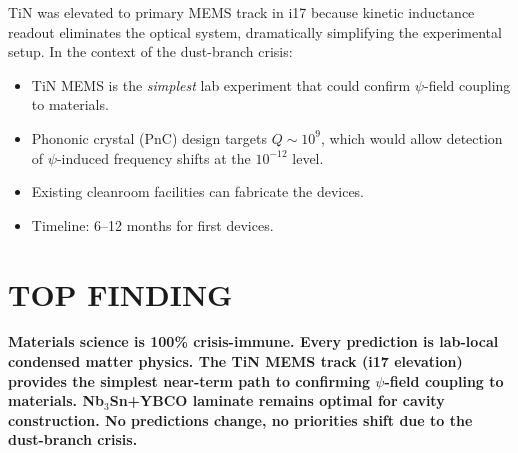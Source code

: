 \documentclass[11pt]{article}
\begin{document}
TiN was elevated to primary MEMS track in i17 because kinetic inductance
readout eliminates the optical system, dramatically simplifying the
experimental setup. In the context of the dust-branch crisis:

\begin{itemize}
\item TiN MEMS is the \emph{simplest} lab experiment that could confirm
  $\psi$-field coupling to materials.
\item Phononic crystal (PnC) design targets $Q \sim 10^9$, which would
  allow detection of $\psi$-induced frequency shifts at the $10^{-12}$
  level.
\item Existing cleanroom facilities can fabricate the devices.
\item Timeline: 6--12 months for first devices.
\end{itemize}

\section*{TOP FINDING}

\begin{tcolorbox}[colback=blue!5!white, colframe=blue!70!black]
\textbf{Materials science is 100\% crisis-immune. Every prediction is
lab-local condensed matter physics. The TiN MEMS track (i17 elevation)
provides the simplest near-term path to confirming $\psi$-field coupling
to materials. Nb$_3$Sn+YBCO laminate remains optimal for cavity
construction. No predictions change, no priorities shift due to the
dust-branch crisis.}
\end{tcolorbox}
\end{document}
